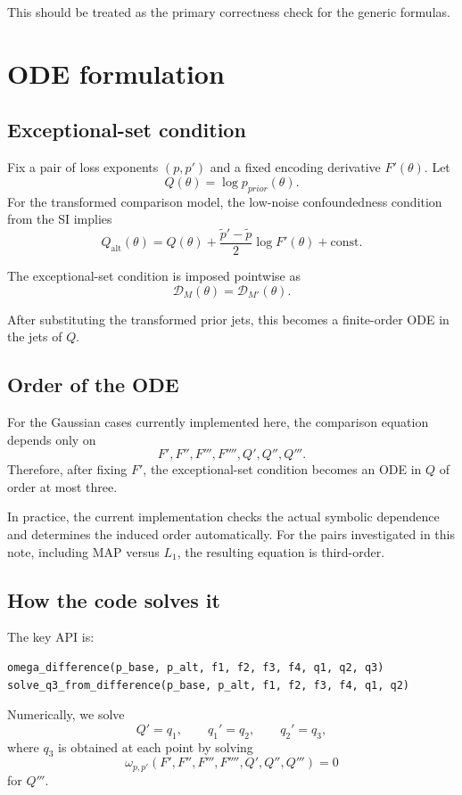 \documentclass[11pt]{article}
\newcommand{\Prior}{p_{prior}}
\begin{document}
This should be treated as the primary correctness check for the generic formulas.

\section{ODE formulation}

\subsection{Exceptional-set condition}

Fix a pair of loss exponents $(p,p')$ and a fixed encoding derivative $F'(\theta)$. Let
\[
Q(\theta)=\log \Prior(\theta).
\]
For the transformed comparison model, the low-noise confoundedness condition from the SI implies
\[
Q_{\mathrm{alt}}(\theta)
=
Q(\theta)
+
\frac{\tilde p'-\tilde p}{2}\log F'(\theta)
+\text{const}.
\]

The exceptional-set condition is imposed pointwise as
\[
\mathcal{D}_{M}(\theta)=\mathcal{D}_{M'}(\theta).
\]

After substituting the transformed prior jets, this becomes a finite-order ODE in the jets of $Q$.

\subsection{Order of the ODE}

For the Gaussian cases currently implemented here, the comparison equation depends only on
\[
F',F'',F''',F'''',Q',Q'',Q'''.
\]
Therefore, after fixing $F'$, the exceptional-set condition becomes an ODE in $Q$ of order at most three.

In practice, the current implementation checks the actual symbolic dependence and determines the induced order automatically. For the pairs investigated in this note, including MAP versus $L_1$, the resulting equation is third-order.

\subsection{How the code solves it}

The key API is:
\begin{Verbatim}[fontsize=\small]
omega_difference(p_base, p_alt, f1, f2, f3, f4, q1, q2, q3)
solve_q3_from_difference(p_base, p_alt, f1, f2, f3, f4, q1, q2)
\end{Verbatim}

Numerically, we solve
\[
Q' = q_1,\qquad
q_1' = q_2,\qquad
q_2' = q_3,
\]
where $q_3$ is obtained at each point by solving
\[
\omega_{p,p'}(F',F'',F''',F'''',Q',Q'',Q''')=0
\]
for $Q'''$.
\end{document}
